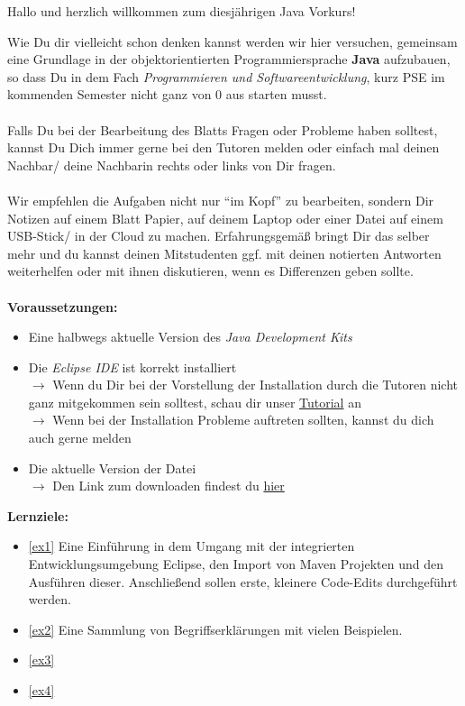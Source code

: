 

\begin{center}
	Hallo und herzlich willkommen zum diesjährigen Java Vorkurs!\\
\end{center}
Wie Du dir vielleicht schon denken kannst werden wir hier versuchen, gemeinsam eine Grundlage in der objektorientierten Programmiersprache \textbf{Java} aufzubauen, so dass Du in dem Fach \textit{Programmieren und Softwareentwicklung}, kurz PSE im kommenden Semester nicht ganz von 0 aus starten musst.\\\\
Falls Du bei der Bearbeitung des Blatts Fragen oder Probleme haben solltest, kannst Du Dich immer gerne bei den Tutoren melden oder einfach mal deinen Nachbar/ deine Nachbarin rechts oder links von Dir fragen.\\\\
Wir empfehlen die Aufgaben nicht nur \enquote{im Kopf} zu bearbeiten, sondern Dir Notizen auf einem Blatt Papier, auf deinem Laptop oder einer Datei auf einem USB-Stick/ in der Cloud zu machen. Erfahrungsgemäß bringt Dir das selber mehr und du kannst deinen Mitstudenten ggf. mit deinen notierten Antworten weiterhelfen oder mit ihnen diskutieren, wenn es Differenzen geben sollte.\\\\
\textbf{Voraussetzungen:}
\begin{itemize}
	\item Eine halbwegs aktuelle Version des \textit{Java Development Kits}
	\item Die \textit{Eclipse IDE} ist korrekt installiert\\
	$\rightarrow$ Wenn du Dir bei der Vorstellung der Installation durch die Tutoren nicht ganz mitgekommen sein solltest, schau dir unser \href{https://youtu.be/zxH3G1MTrVs}{Tutorial} an\\
	$\rightarrow$ Wenn bei der Installation Probleme auftreten sollten, kannst du dich auch gerne melden
	\item Die aktuelle Version der \texttt{\jvkpackage} Datei\\
	$\rightarrow$ Den Link zum downloaden findest du \href{\jvkpackageurl}{hier}
\end{itemize}
\textbf{Lernziele:}
\begin{itemize}
	\item \ref{ex1} Eine Einführung in dem Umgang mit der integrierten Entwicklungsumgebung Eclipse, den Import von Maven Projekten und den Ausführen dieser. Anschließend sollen erste, kleinere Code-Edits durchgeführt werden.
	\item \ref{ex2} Eine Sammlung von Begriffserklärungen mit vielen Beispielen.
	\item \ref{ex3}
	\item \ref{ex4}
\end{itemize}

